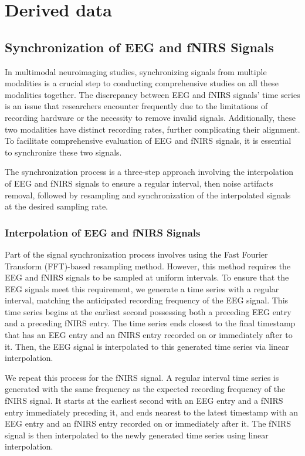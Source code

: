 \section{Derived data}

\subsection{Synchronization of EEG and fNIRS Signals}

In multimodal neuroimaging studies, synchronizing signals from multiple
modalities is a crucial step to conducting comprehensive studies on all these
modalities together. The discrepancy between EEG and fNIRS signals' time series
is an issue that researchers encounter frequently due to the limitations of
recording hardware or the necessity to remove invalid signals. Additionally,
these two modalities have distinct recording rates, further complicating their
alignment. To facilitate comprehensive evaluation of EEG and fNIRS signals, it
is essential to synchronize these two signals.

The synchronization process is a three-step approach involving the
interpolation of EEG and fNIRS signals to ensure a regular interval, then noise
artifacts removal, followed by resampling and synchronization of the
interpolated signals at the desired sampling rate.

\subsubsection{Interpolation of EEG and fNIRS Signals}

Part of the signal synchronization process involves using the Fast Fourier
Transform (FFT)-based resampling method. However, this method requires the EEG
and fNIRS signals to be sampled at uniform intervals. To ensure that the EEG
signals meet this requirement, we generate a time series with a regular
interval, matching the anticipated recording frequency of the EEG signal. This
time series begins at the earliest second possessing both a preceding EEG entry
and a preceding fNIRS entry. The time series ends closest to the final
timestamp that has an EEG entry and an fNIRS entry recorded on or immediately
after to it. Then, the EEG signal is interpolated to this generated time series
via linear interpolation.

We repeat this process for the fNIRS signal. A regular interval time series is
generated with the same frequency as the expected recording frequency of the
fNIRS signal. It starts at the earliest second with an EEG entry and a fNIRS
entry immediately preceding it, and ends nearest to the latest timestamp with
an EEG entry and an fNIRS entry recorded on or immediately after it. The fNIRS
signal is then interpolated to the newly generated time series using linear
interpolation.

